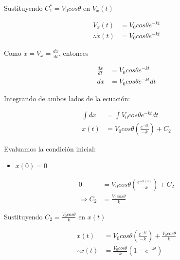 Sustituyendo $C_{1}^{*} = V_{0}cos \theta$ en $V_{x} (t)$

\begin{align*}
    V_{x} (t) &= V_{0}cos \theta e^{-kt} \\
    \therefore  \dot{x} (t) &= V_{0}cos \theta e^{-kt}
\end{align*}

Como $\dot{x}=V_{x}=\frac{dx}{dt}$, entonces

\begin{align*}
    \frac{dx}{dt} &= V_{0}cos \theta e^{-kt} \\
    dx &= V_{0}cos \theta e^{-kt} dt 
\end{align*}

Integrando de ambos lados de la ecuación:

\begin{align*}
    \int dx &= \int V_{0}cos \theta e^{-kt} dt \\
    x(t) &= V_{0} cos \theta \left( \frac{e^{-kt}}{-k} \right) + C_{2}
\end{align*}

Evaluamos la condición inicial:

\begin{itemize}
    \item $x (0) = 0 $
\end{itemize}

\begin{align*}
    0 &= V_{0} cos \theta \left( \frac{e^{-k(0)}}{-k} \right) + C_{2} \\
    \Rightarrow C_{2} &= \frac{V_{0} cos \theta}{k}
\end{align*}

Sustituyendo $ C_{2} = \frac{V_{0} cos \theta}{k} $ en $x(t)$

\begin{align*}
    x(t) &= V_{0} cos \theta \left( \frac{e^{-kt}}{-k} \right) + \frac{V_{0} cos \theta}{k} \\
    \therefore x(t) &= \frac{V_{0} cos \theta}{k} \left( 1-e^{-kt} \right)
\end{align*}